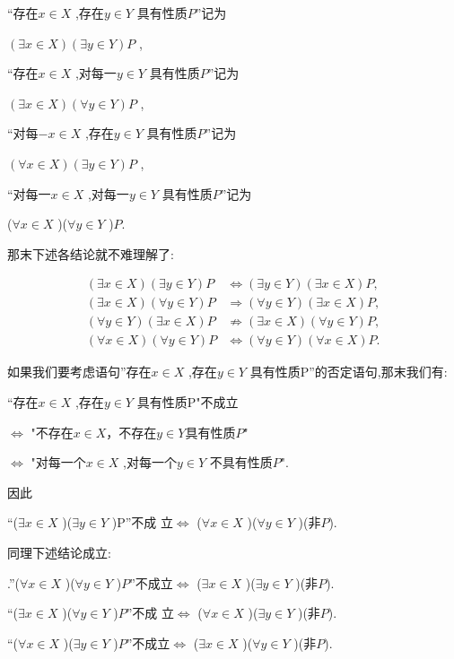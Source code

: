 ``存在\(x \in X\) ,存在\(y \in Y\) 具有性质$P$''记为

\((\exists x \in X)(\exists y \in Y)P\) ,

``存在\(x \in X\) ,对每一\(y \in Y\) 具有性质$P$''记为

\((\exists x \in X)(\forall y \in Y)P\) ,

``对每\(-x \in X\) ,存在\(y \in Y\) 具有性质$P$''记为

\((\forall x \in X)(\exists y \in Y)P\) ,

``对每一\(x \in X\) ,对每一\(y \in Y\) 具有性质$P$''记为

 (\(\forall x \in X\) )(\(\forall y \in Y\) )$P$.

那末下述各结论就不难理解了:

\begin{align*}
	(\exists x \in X)(\exists y \in Y)P
	&\iff (\exists y \in Y)(\exists x \in X)P, \\[6pt]
	(\exists x \in X)(\forall y \in Y)P
	&\Longrightarrow (\forall y \in Y)(\exists x \in X)P, \\[6pt]
	(\forall y \in Y)(\exists x \in X)P
	&\not\Longrightarrow (\exists x \in X)(\forall y \in Y)P, \\[6pt]
	(\forall x \in X)(\forall y \in Y)P
	&\iff (\forall y \in Y)(\forall x \in X)P.
\end{align*}

如果我们要考虑语句''存在\(x \in X\) ,存在\(y \in Y\) 具有性质P''的否定语句,那末我们有:

“存在\(x \in X\) ,存在\(y \in Y\) 具有性质P"不成立

\(\iff\) "不存在$x\in X$，不存在$y \in Y$具有性质$P$" 

\(\iff\) "对每一个\(x \in X\) ,对每一个\(y \in Y\) 不具有性质$P$".

因此

``(\(\exists x \in X\) )(\(\exists y \in Y\) )P''不成 立\(\iff\) (\(\forall x \in X\) )(\(\forall y \in Y\) )(非$P$).

同理下述结论成立:

.''(\(\forall x \in X\) )(\(\forall y \in Y\) )$P$''不成立\(\Longleftrightarrow\) (\(\exists x \in X\) )(\(\exists y \in Y\) )(非$P$).

``(\(\exists x \in X\) )(\(\forall y \in Y\) )\(P\)''不成 立\(\Longleftrightarrow\) (\(\forall x \in X\) )(\(\exists y \in Y\) )(非$P$).

``(\(\forall x \in X\) )(\(\exists y \in Y  \)  )$P$''不成立\(\iff\) (\(\exists x \in X\) )(\(\forall y \in Y\) )(非$P$).

